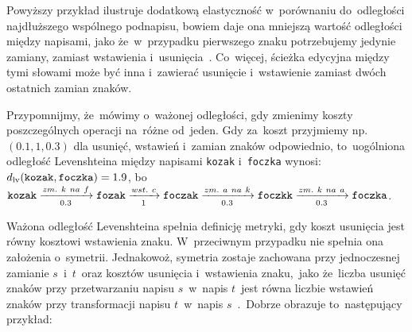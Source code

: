 \documentclass{praca1}
\begin{document}
Powyższy przykład ilustruje dodatkową elastyczność w~porównaniu do~odległości najdłuższego wspólnego podnapisu, bowiem daje ona mniejszą wartość odległości między napisami, jako że~w~przypadku pierwszego znaku potrzebujemy jedynie zamiany, zamiast wstawienia i~usunięcia~\cite{Loo2014:stringdist}. Co~więcej, ścieżka edycyjna między tymi słowami może być inna i~zawierać usunięcie i~wstawienie zamiast dwóch ostatnich zamian znaków.


Przypomnijmy, że~mówimy o~ważonej odległości, gdy zmienimy koszty poszczególnych operacji na~różne od~jeden.
Gdy za~koszt przyjmiemy np. $(0.1, 1, 0.3)$ dla usunięć, wstawień i~zamian znaków odpowiednio, to~uogólniona odległość Levenshteina między napisami \verb|kozak| i~\verb|foczka| wynosi: $d_{\mathrm{lv}}(\verb|kozak|, \verb|foczka|) = 1.9$, bo~$\verb|kozak|  \xrightarrow[0.3]{zm.\ k\ na\ f} \verb|fozak| \xrightarrow[1]{wst.\ c} \verb|foczak| \xrightarrow[0.3]{zm.\ a\ na\ k} \verb|foczkk| \xrightarrow[0.3]{zm.\ k\ na\ a} \verb|foczka|$.

Ważona odległość Levenshteina spełnia definicję metryki, gdy koszt usunięcia jest równy kosztowi wstawienia znaku. W~przeciwnym przypadku nie spełnia ona założenia o~symetrii. Jednakowoż, symetria zostaje zachowana przy jednoczesnej zamianie $s$~i~$t$~oraz kosztów usunięcia i~wstawienia znaku,~jako że~liczba usunięć znaków przy przetwarzaniu napisu $s$~w~napis $t$~jest równa liczbie wstawień znaków przy transformacji napisu $t$~w~napis $s$~\cite{Loo2014:stringdist}.~Dobrze obrazuje to~następujący przykład:
\end{document}
